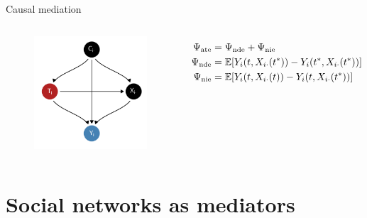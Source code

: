 \documentclass[aspectratio=169]{beamer}
\theoremstyle{remark}
\begin{document}
\begin{frame}{Causal mediation}
\begin{columns}
        \centering
        \begin{figure}[ht]
            \includegraphics[width=.7\textwidth]{figures/dags/mediating.png}
        \end{figure}
        \vspace{-7mm}
        \begin{align*}
            \ate & = \nde + \nie                                                    \\
            \nde & = \E{Y_i (t, \X_{i \cdot}(t^*)) - Y_i (t^*, \X_{i \cdot} (t^*))} \\
            \nie & = \E{Y_i (t, \X_{i \cdot}(t)) - Y_i (t, \X_{i \cdot} (t^*))}
        \end{align*}
    \end{columns}




\end{frame}


\section{Social networks as mediators}
\end{document}
